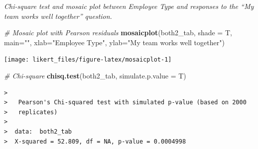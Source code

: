 \documentclass[]{book}
\newenvironment{Shaded}{\begin{snugshade}}{\end{snugshade}}
\newcommand{\KeywordTok}[1]{\textcolor[rgb]{0.13,0.29,0.53}{\textbf{{#1}}}}
\newcommand{\DataTypeTok}[1]{\textcolor[rgb]{0.13,0.29,0.53}{{#1}}}
\newcommand{\StringTok}[1]{\textcolor[rgb]{0.31,0.60,0.02}{{#1}}}
\newcommand{\CommentTok}[1]{\textcolor[rgb]{0.56,0.35,0.01}{\textit{{#1}}}}
\newcommand{\NormalTok}[1]{{#1}}
\begin{document}
\begin{Shaded}
\end{Shaded}

\emph{Chi-square test and mosaic plot between Employee Type and
responses to the ``My team works well together'' question.}

\begin{Shaded}
\begin{Highlighting}[]
\CommentTok{# Mosaic plot with Pearson residuals}
\KeywordTok{mosaicplot}\NormalTok{(both2_tab, }\DataTypeTok{shade =} \NormalTok{T, }\DataTypeTok{main=}\StringTok{""}\NormalTok{, }\DataTypeTok{xlab=}\StringTok{"Employee Type"}\NormalTok{, }
           \DataTypeTok{ylab=}\StringTok{"My team works well together"}\NormalTok{)}
\end{Highlighting}
\end{Shaded}

\begin{center}\texttt{[image: likert\_files/figure-latex/mosaicplot-1]} \end{center}

\begin{Shaded}
\begin{Highlighting}[]
\CommentTok{# Chi-square}
\KeywordTok{chisq.test}\NormalTok{(both2_tab, }\DataTypeTok{simulate.p.value =} \NormalTok{T)}
\end{Highlighting}
\end{Shaded}

\begin{verbatim}
>  
>   Pearson's Chi-squared test with simulated p-value (based on 2000
>   replicates)
>  
>  data:  both2_tab
>  X-squared = 52.809, df = NA, p-value = 0.0004998
\end{verbatim}
\end{document}
